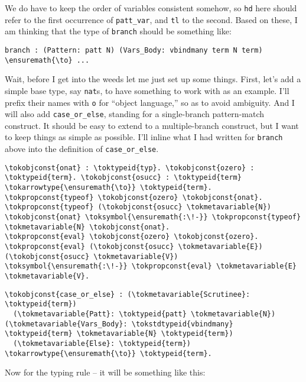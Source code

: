 We do have to keep the order of variables consistent somehow, so
\texttt{hd} here should refer to the first occurrence of
\texttt{patt\_var}, and \texttt{tl} to the second. Based on these, I am
thinking that the type of \texttt{branch} should be something like:

\begin{verbatim}
branch : (Pattern: patt N) (Vars_Body: vbindmany term N term) \ensuremath{\to} ...
\end{verbatim}

Wait, before I get into the weeds let me just set up some things. First,
let's add a simple base type, say \texttt{nat}s, to have something to
work with as an example. I'll prefix their names with \texttt{o} for
``object language,'' so as to avoid ambiguity. And I will also add
\texttt{case\_or\_else}, standing for a single-branch pattern-match
construct. It should be easy to extend to a multiple-branch construct,
but I want to keep things as simple as possible. I'll inline what I had
written for \texttt{branch} above into the definition of
\texttt{case\_or\_else}.

\begin{verbatim}
\tokobjconst{onat} : \toktypeid{typ}. \tokobjconst{ozero} : \toktypeid{term}. \tokobjconst{osucc} : \toktypeid{term} \tokarrowtype{\ensuremath{\to}} \toktypeid{term}.
\tokpropconst{typeof} \tokobjconst{ozero} \tokobjconst{onat}. \tokpropconst{typeof} (\tokobjconst{osucc} \tokmetavariable{N}) \tokobjconst{onat} \toksymbol{\ensuremath{:\!-}} \tokpropconst{typeof} \tokmetavariable{N} \tokobjconst{onat}.
\tokpropconst{eval} \tokobjconst{ozero} \tokobjconst{ozero}. \tokpropconst{eval} (\tokobjconst{osucc} \tokmetavariable{E}) (\tokobjconst{osucc} \tokmetavariable{V}) \toksymbol{\ensuremath{:\!-}} \tokpropconst{eval} \tokmetavariable{E} \tokmetavariable{V}.
\end{verbatim}

\begin{verbatim}
\tokobjconst{case_or_else} : (\tokmetavariable{Scrutinee}: \toktypeid{term})
  (\tokmetavariable{Patt}: \toktypeid{patt} \tokmetavariable{N}) (\tokmetavariable{Vars_Body}: \tokstdtypeid{vbindmany} \toktypeid{term} \tokmetavariable{N} \toktypeid{term})
  (\tokmetavariable{Else}: \toktypeid{term}) \tokarrowtype{\ensuremath{\to}} \toktypeid{term}.
\end{verbatim}

Now for the typing rule -- it will be something like this:

